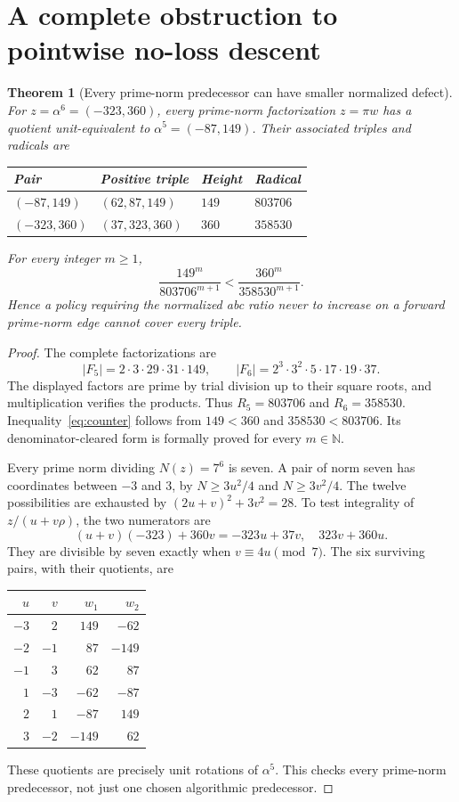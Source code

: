 \documentclass[11pt]{article}
\newtheorem{theorem}{Theorem}[section]
\theoremstyle{definition}
\theoremstyle{remark}
\newcommand{\NN}{\mathbb N}
\begin{document}
\section{A complete obstruction to pointwise no-loss descent}\label{sec:counter}
\begin{theorem}[Every prime-norm predecessor can have smaller normalized defect]\label{thm:counter}
For $z=\alpha^6=(-323,360)$, every prime-norm factorization $z=\pi w$ has a quotient unit-equivalent to $\alpha^5=(-87,149)$. Their associated triples and radicals are
\begin{center}
\begin{tabular}{@{}llll@{}}
\toprule
Pair & Positive triple & Height & Radical\\\midrule
$(-87,149)$ & $(62,87,149)$ & $149$ & $803706$\\
$(-323,360)$ & $(37,323,360)$ & $360$ & $358530$\\\bottomrule
\end{tabular}
\end{center}
For every integer $m\ge1$,
\begin{equation}\label{eq:counter}
\frac{149^m}{803706^{m+1}}<\frac{360^m}{358530^{m+1}}.
\end{equation}
Hence a policy requiring the normalized abc ratio never to increase on a forward prime-norm edge cannot cover every triple.
\end{theorem}
\begin{proof}
The complete factorizations are
\[
|F_5|=2\cdot3\cdot29\cdot31\cdot149,
\qquad |F_6|=2^3\cdot3^2\cdot5\cdot17\cdot19\cdot37.
\]
The displayed factors are prime by trial division up to their square roots, and multiplication verifies the products. Thus $R_5=803706$ and $R_6=358530$. Inequality~\eqref{eq:counter} follows from $149<360$ and $358530<803706$. Its denominator-cleared form is formally proved for every $m\in\NN$.

Every prime norm dividing $N(z)=7^6$ is seven. A pair of norm seven has coordinates between $-3$ and $3$, by $N\ge3u^2/4$ and $N\ge3v^2/4$. The twelve possibilities are exhausted by $(2u+v)^2+3v^2=28$. To test integrality of $z/(u+v\rho)$, the two numerators are
\[
(u+v)(-323)+360v=-323u+37v,
\quad 323v+360u.
\]
They are divisible by seven exactly when $v\equiv4u\pmod7$. The six surviving pairs, with their quotients, are
\begin{center}
\begin{tabular}{@{}rr@{\qquad}rr@{}}
\toprule
$u$&$v$&$w_1$&$w_2$\\\midrule
$-3$&$2$&$149$&$-62$\\
$-2$&$-1$&$87$&$-149$\\
$-1$&$3$&$62$&$87$\\
$1$&$-3$&$-62$&$-87$\\
$2$&$1$&$-87$&$149$\\
$3$&$-2$&$-149$&$62$\\\bottomrule
\end{tabular}
\end{center}
These quotients are precisely unit rotations of $\alpha^5$. This checks every prime-norm predecessor, not just one chosen algorithmic predecessor.
\end{proof}
\end{document}
